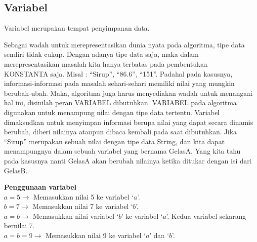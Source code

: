 \subsection{Variabel}
Variabel merupakan tempat penyimpanan data. 

Sebagai wadah untuk merepresentasikan dunia nyata pada algoritma, tipe data sendiri tidak cukup. Dengan adanya tipe data saja, maka dalam merepresentasikan masalah kita hanya terbatas pada pembentukan KONSTANTA saja. Misal : “Sirup”, “86.6”, “151”.  Padahal pada kasusnya, informasi-informasi pada masalah sehari-sehari memiliki nilai yang mungkin berubah-ubah. Maka, algoritma juga harus menyediakan wadah untuk menangani hal ini,  disinilah peran VARIABEL dibutuhkan. 
	VARIABEL pada algoritma digunakan untuk menampung nilai dengan tipe data tertentu. Variabel dimaksudkan untuk menyimpan informasi berupa nilai yang dapat secara dinamis berubah, diberi nilainya ataupun dibaca kembali pada saat dibutuhkan. Jika “Sirup” merupakan sebuah nilai dengan tipe data String, dan kita dapat menampungnya dalam sebuah variabel yang bernama GelasA. Yang kita tahu pada kasusnya nanti GelasA akan berubah nilainya ketika ditukar dengan isi dari GelasB.
\begin{contoh}
	\textbf{Penggunaan variabel}\\
	$a = 5 \rightarrow$ Memasukkan nilai 5 ke variabel `$a$'.\\
	$b = 7 \rightarrow$ Memasukkan nilai 7 ke variabel `$b$'.\\
	$a = b \rightarrow$ Memasukkan nilai variabel `$b$' ke variabel `$a$'. Kedua variabel sekarang bernilai 7.\\
	$a = b = 9 \rightarrow$ Memasukkan nilai 9 ke variabel `$a$' dan `$b$'.\\
\end{contoh}

